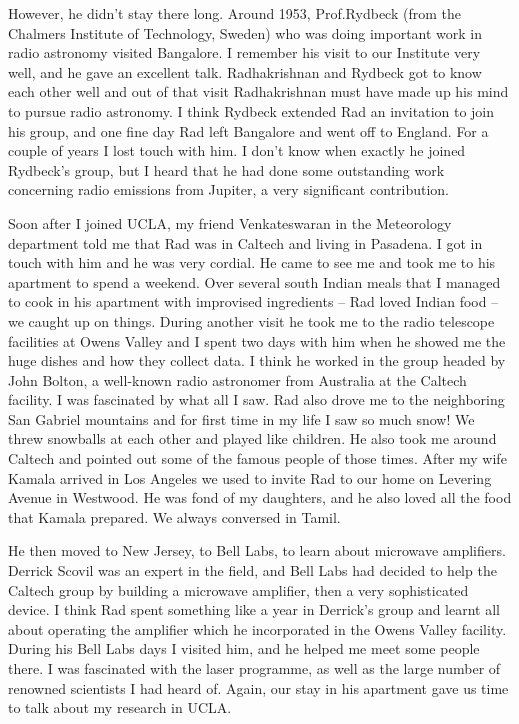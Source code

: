However, he didn't stay there long. Around 1953, Prof.\@ Rydbeck (from the Chalmers Institute of Technology, Sweden) who was doing important work in radio astronomy visited Bangalore. I remember his visit to our Institute very well, and he gave an excellent talk. Radhakrishnan and Rydbeck got to know each other well and out of that visit Radhakrishnan must have made up his mind to pursue radio astronomy. I think Rydbeck extended Rad an invitation to join his group, and one fine day Rad left Bangalore and went off to England. For a couple of years I lost touch with him. I don't know when exactly he joined Rydbeck's group, but I heard that he had done some outstanding work concerning radio emissions from Jupiter, a very significant contribution. 

Soon after I joined UCLA, my friend Venkateswaran in the  Meteorology department told me that Rad was in Caltech and living in Pasadena. I got in touch with him and he was very cordial. He came to see me and took me to his apartment to spend a weekend. Over several south Indian meals that I managed to cook in his apartment with improvised ingredients -- Rad loved Indian food -- we caught up on things. During another visit he took me to the radio telescope facilities at Owens Valley and I spent two days with him when he showed me the huge dishes and how they collect data. I think he worked in the group headed by John Bolton, a well-known radio astronomer from Australia at the Caltech facility. I was fascinated by what all I saw. Rad also drove me to the neighboring San Gabriel mountains and for first time in my life I saw so much snow! We threw snowballs at each other and played like children. He also took me around Caltech and pointed out some of the famous people of those times. After my wife Kamala arrived in Los Angeles we used to invite Rad to our home on Levering Avenue in Westwood. He was fond of my daughters, and he also loved all the food that Kamala prepared. We always conversed in Tamil.

\eject

He then moved to New Jersey, to Bell Labs, to learn about microwave amplifiers. Derrick Scovil was an expert in the field, and Bell Labs had decided to help the Caltech group by building a microwave amplifier, then a very sophisticated device. I think Rad spent something like a year in Derrick's group and learnt all about operating the amplifier which he incorporated in the Owens Valley facility. During his Bell Labs days I visited him, and he helped me meet some people there.  I was fascinated with the laser programme, as well as the large number of renowned scientists I had heard of. Again, our stay in his apartment gave us time to talk about my research in UCLA. 


